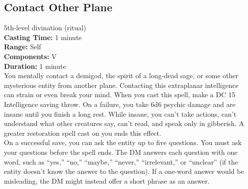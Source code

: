 \documentclass[11pt, A4paper, english]{article}
\begin{document}
		\subsection{Contact Other Plane}
5th-level divination (ritual) \\
\textbf{Casting Time:} 1 minute \\
\textbf{Range:} Self \\
\textbf{Components:} V \\
\textbf{Duration:} 1 minute \\
You mentally contact a demigod, the spirit of a long-dead sage, or some other mysterious entity from another plane. Contacting this extraplanar intelligence can strain or even break your mind. When you cast this spell, make a DC 15 Intelligence saving throw. On a failure, you take 6d6 psychic damage and are insane until you finish a long rest. While insane, you can’t take actions, can’t understand what other creatures say, can’t read, and speak only in gibberish. A greater restoration spell cast on you ends this effect. \\
On a successful save, you can ask the entity up to five questions. You must ask your questions before the spell ends. The DM answers each question with one word, such as “yes,” “no,” “maybe,” “never,” “irrelevant,” or “unclear” (if the entity doesn’t know the answer to the question). If a one-word answer would be misleading, the DM might instead offer a short phrase as an answer.
\end{document}
